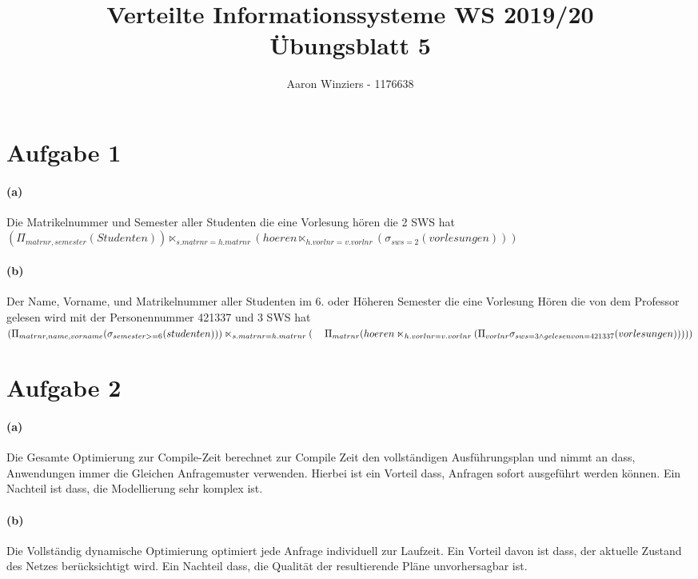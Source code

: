 \documentclass[11pt,a4paper,parskip=half ]{scrartcl}
\author{Aaron Winziers - 1176638}
\title{Verteilte Informationssysteme WS 2019/20\\\LARGE{Übungsblatt 5}}
\begin{document}
	\maketitle
	
	\section*{Aufgabe 1}
	\paragraph{(a)} Die Matrikelnummer und Semester aller Studenten die eine Vorlesung hören die 2 SWS hat	\\
	$ (\Pi_{matrnr, semester}(Studenten)) \ltimes_{s.matrnr=h.matrnr} (hoeren \ltimes_{h.vorlnr=v.vorlnr} (\sigma_{sws=2}(vorlesungen))) $
	
	\paragraph{(b)}Der Name, Vorname, und Matrikelnummer aller Studenten im 6. oder Höheren Semester die eine Vorlesung Hören die von dem Professor gelesen wird mit der Personennummer 421337 und 3 SWS hat	\\
	$(\Pi_{matrnr, name, vorname}(\sigma_{semester>=6}(studenten)))\ltimes_{s.matrnr=h.matrnr}(\\
	\hspace*{12pt}\Pi_{matrnr}(hoeren\ltimes_{h.vorlnr=v.vorlnr}(\Pi_{vorlnr}\sigma_{sws = 3 \land gelesenvon=421337}(vorlesungen))))) $
	
	
	\section*{Aufgabe 2}
	\paragraph{(a)} Die Gesamte Optimierung zur Compile-Zeit berechnet zur Compile Zeit den vollständigen Ausführungsplan und nimmt an dass, Anwendungen immer die Gleichen Anfragemuster verwenden. Hierbei ist ein Vorteil dass, Anfragen sofort ausgeführt werden können. Ein Nachteil ist dass, die Modellierung sehr komplex ist.
	
	\paragraph{(b)} Die Vollständig dynamische Optimierung optimiert jede Anfrage individuell zur Laufzeit. Ein Vorteil davon ist dass, der aktuelle Zustand des Netzes berücksichtigt wird. Ein Nachteil dass, die Qualität der resultierende Pläne unvorhersagbar ist.
	
\end{document}

